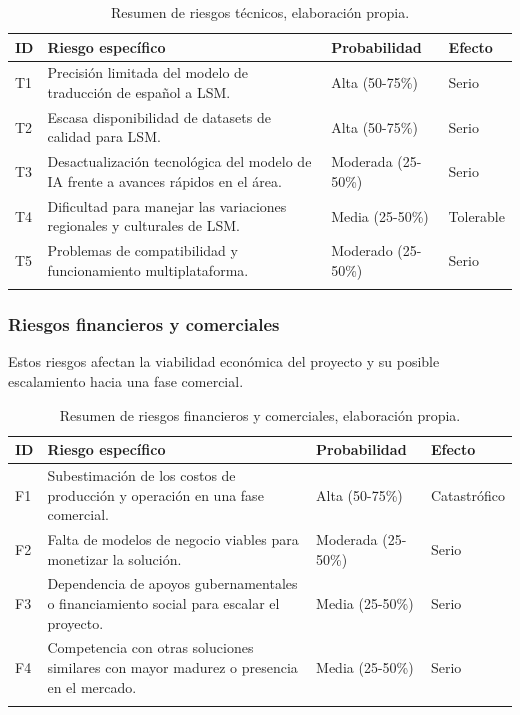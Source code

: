 \begin{longtable}{|>{\centering\arraybackslash}p{0.8cm}|>{\raggedright\arraybackslash}p{3.5cm}|>{\raggedright\arraybackslash}p{5.1cm}|>{\raggedright\arraybackslash}p{5.1cm}|}
	\hline
	\textbf{ID} & \textbf{Riesgo específico} & \textbf{Probabilidad} & \textbf{Efecto} \\
	\hline
	T1 & Precisión limitada del modelo de traducción de español a LSM. & Alta (50-75\%) & Serio \\
	\hline
	T2 & Escasa disponibilidad de datasets de calidad para LSM. & Alta (50-75\%) & Serio \\
	\hline
	T3 & Desactualización tecnológica del modelo de IA frente a avances rápidos en el área. & Moderada (25-50\%) & Serio \\
	\hline
	T4 & Dificultad para manejar las variaciones regionales y culturales de LSM. & Media (25-50\%) & Tolerable \\
	\hline
	T5 & Problemas de compatibilidad y funcionamiento multiplataforma. & Moderado (25-50\%) & Serio \\
	\hline
\caption[Resumen de riesgos técnicos]{Resumen de riesgos técnicos, elaboración propia.} \label{tab:riesgos_tecnicos_resumen} \\

\end{longtable}

\newpage
\subsubsection{Riesgos financieros y comerciales}
Estos riesgos afectan la viabilidad económica del proyecto y su posible escalamiento hacia una fase comercial.

\setlength{\tabcolsep}{4pt}
\renewcommand{\arraystretch}{1.2}

\begin{longtable}{|>{\centering\arraybackslash}p{0.8cm}|>{\raggedright\arraybackslash}p{3.5cm}|>{\raggedright\arraybackslash}p{5.1cm}|>{\raggedright\arraybackslash}p{5.1cm}|}
	\hline
	\textbf{ID} & \textbf{Riesgo específico} & \textbf{Probabilidad} & \textbf{Efecto} \\
	\hline
	F1 & Subestimación de los costos de producción y operación en una fase comercial. & Alta (50-75\%) & Catastrófico \\
	\hline
	F2 & Falta de modelos de negocio viables para monetizar la solución. & Moderada (25-50\%) & Serio \\
	\hline
	F3 & Dependencia de apoyos gubernamentales o financiamiento social para escalar el proyecto. & Media (25-50\%) & Serio \\
	\hline
	F4 & Competencia con otras soluciones similares con mayor madurez o presencia en el mercado. & Media (25-50\%) & Serio \\
	\hline

\caption[Resumen de riesgos financieros y comerciales]{Resumen de riesgos financieros y comerciales, elaboración propia.} \label{tab:riesgos_financieros_resumen} \\
\end{longtable}

